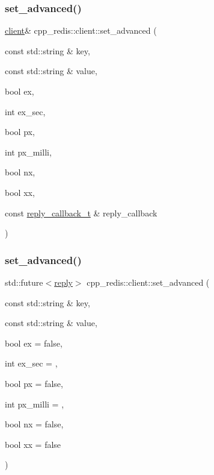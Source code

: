 \mbox{\label{classcpp__redis_1_1client_a60db35e46bcbe36e5264ee04933162fd}} 
\subsubsection{\texorpdfstring{set\+\_\+advanced()}{set\_advanced()}\hspace{0.1cm}{\footnotesize\ttfamily [2/3]}}
{\footnotesize\ttfamily \hyperlink{classcpp__redis_1_1client}{client}\& cpp\+\_\+redis\+::client\+::set\+\_\+advanced (\begin{DoxyParamCaption}\item[{const std\+::string \&}]{key,  }\item[{const std\+::string \&}]{value,  }\item[{bool}]{ex,  }\item[{int}]{ex\+\_\+sec,  }\item[{bool}]{px,  }\item[{int}]{px\+\_\+milli,  }\item[{bool}]{nx,  }\item[{bool}]{xx,  }\item[{const \hyperlink{classcpp__redis_1_1client_a061a1140d36d2eaeda82b09a0bb3f9f2}{reply\+\_\+callback\+\_\+t} \&}]{reply\+\_\+callback }\end{DoxyParamCaption})}

\mbox{\label{classcpp__redis_1_1client_a208688fdc336009701256722ef7e2a2b}} 
\subsubsection{\texorpdfstring{set\+\_\+advanced()}{set\_advanced()}\hspace{0.1cm}{\footnotesize\ttfamily [3/3]}}
{\footnotesize\ttfamily std\+::future$<$\hyperlink{classcpp__redis_1_1reply}{reply}$>$ cpp\+\_\+redis\+::client\+::set\+\_\+advanced (\begin{DoxyParamCaption}\item[{const std\+::string \&}]{key,  }\item[{const std\+::string \&}]{value,  }\item[{bool}]{ex = {\ttfamily false},  }\item[{int}]{ex\+\_\+sec = {},  }\item[{bool}]{px = {\ttfamily false},  }\item[{int}]{px\+\_\+milli = {},  }\item[{bool}]{nx = {\ttfamily false},  }\item[{bool}]{xx = {\ttfamily false} }\end{DoxyParamCaption})}

